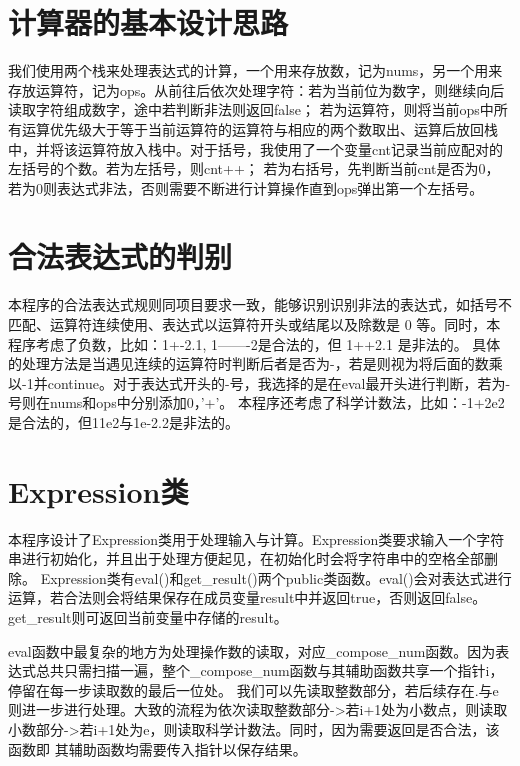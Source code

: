 \documentclass[UTF8]{ctexart}
\begin{document}
\pagestyle{fancy}
\fancyhead{}

\section{计算器的基本设计思路}

\par 我们使用两个栈来处理表达式的计算，一个用来存放数，记为nums，另一个用来存放运算符，记为ops。从前往后依次处理字符：若为当前位为数字，则继续向后读取字符组成数字，途中若判断非法则返回false；
若为运算符，则将当前ops中所有运算优先级大于等于当前运算符的运算符与相应的两个数取出、运算后放回栈中，并将该运算符放入栈中。对于括号，我使用了一个变量cnt记录当前应配对的左括号的个数。若为左括号，则cnt++；
若为右括号，先判断当前cnt是否为0，若为0则表达式非法，否则需要不断进行计算操作直到ops弹出第一个左括号。

\section{合法表达式的判别}

\par 本程序的合法表达式规则同项目要求一致，能够识别识别非法的表达式，如括号不匹配、运算符连续使用、表达式以运算符开头或结尾以及除数是 0 等。同时，本程序考虑了负数，比如：1+-2.1, 1-------2是合法的，但 1++2.1 是非法的。
具体的处理方法是当遇见连续的运算符时判断后者是否为-，若是则视为将后面的数乘以-1并continue。对于表达式开头的-号，我选择的是在eval最开头进行判断，若为-号则在nums和ops中分别添加0，'+'。
本程序还考虑了科学计数法，比如：-1+2e2是合法的，但11e2与1e-2.2是非法的。

\section{Expression类}

\par 本程序设计了Expression类用于处理输入与计算。Expression类要求输入一个字符串进行初始化，并且出于处理方便起见，在初始化时会将字符串中的空格全部删除。
Expression类有eval()和get_result()两个public类函数。eval()会对表达式进行运算，若合法则会将结果保存在成员变量result中并返回true，否则返回false。
get_result则可返回当前变量中存储的result。

\par eval函数中最复杂的地方为处理操作数的读取，对应_compose_num函数。因为表达式总共只需扫描一遍，整个_compose_num函数与其辅助函数共享一个指针i，停留在每一步读取数的最后一位处。
我们可以先读取整数部分，若后续存在.与e则进一步进行处理。大致的流程为依次读取整数部分->若i+1处为小数点，则读取小数部分->若i+1处为e，则读取科学计数法。同时，因为需要返回是否合法，该函数即
其辅助函数均需要传入指针以保存结果。
\end{document}
